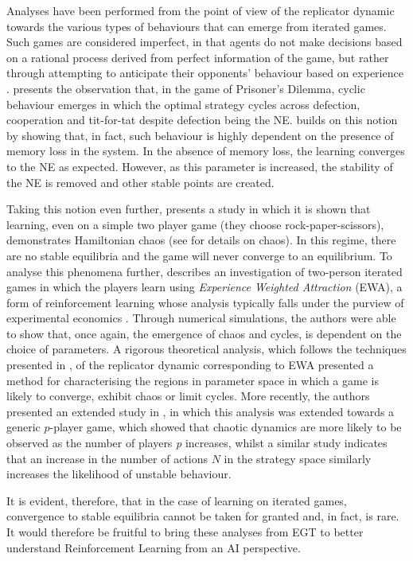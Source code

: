 \documentclass[sigconf,anonymous]{aamas}
\begin{document}
Analyses have been performed from the point of view of the replicator dynamic towards the various types of behaviours that can emerge from iterated games. Such games are considered imperfect, in that agents do not make decisions based on a rational process derived from perfect information of the game, but rather through attempting to anticipate their opponents' behaviour based on experience \cite{Galla2011}. \cite{Imhof2005} presents the observation that, in the game of Prisoner's Dilemma, cyclic behaviour emerges in which the optimal strategy cycles across defection, cooperation and tit-for-tat despite defection being the NE. \cite{Galla2011} builds on this notion by showing that, in fact, such behaviour is highly dependent on the presence of memory loss in the system. In the absence of memory loss, the learning converges to the NE as expected. However, as this parameter is increased, the stability of the NE is removed and other stable points are created. 

Taking this notion even further, \cite{Sato2002} presents a study in which it is shown that learning, even on a simple two player game (they choose rock-paper-scissors), demonstrates Hamiltonian chaos (see \cite{Strogatz2000} for details on chaos). In this regime, there are no stable equilibria and the game will never converge to an equilibrium. To analyse this phenomena further, \cite{Galla2013} describes an investigation of two-person iterated games in which the players learn using \textit{Experience Weighted Attraction} (EWA), a form of reinforcement learning whose analysis typically falls under the purview of experimental economics \cite{Camerer2009}. Through numerical simulations, the authors were able to show that, once again, the emergence of chaos and cycles, is dependent on the choice of parameters. A rigorous theoretical analysis, which follows the techniques presented in \cite{Opper1992}, of the replicator dynamic corresponding to EWA presented a method for characterising the regions in parameter space in which a game is likely to converge, exhibit chaos or limit cycles. More recently, the authors presented an extended study in \cite{Sanders2018}, in which this analysis was extended towards a generic $p$-player game, which showed that chaotic dynamics are more likely to be observed as the number of players \textit{p} increases, whilst a similar study \cite{Pangallo2019} indicates that an increase in the number of actions $N$ in the strategy space similarly increases the likelihood of unstable behaviour. 

It is evident, therefore, that in the case of learning on iterated games, convergence to stable equilibria cannot be taken for granted and, in fact, is rare. It would therefore be fruitful to bring these analyses from EGT to better understand Reinforcement Learning from an AI perspective.
\end{document}
